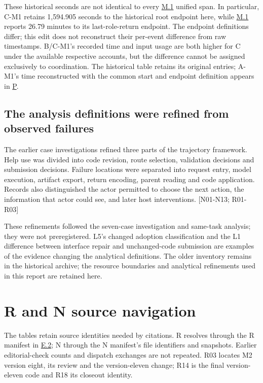 These historical seconds are not identical to every \hyperlink{m1}{M.1} unified span. In particular, C-M1 retains 1,594.905 seconds to the historical root endpoint here, while \hyperlink{m1}{M.1} reports 26.79 minutes to its last-role-return endpoint. The endpoint definitions differ; this edit does not reconstruct their per-event difference from raw timestamps. B/C-M1's recorded time and input usage are both higher for C under the available respective accounts, but the difference cannot be assigned exclusively to coordination. The historical table retains its original entries; A-M1's time reconstructed with the common start and endpoint definition appears in \hyperlink{appendix-p}{P}.

\subsection[The analysis definitions were refined from observed failures]{\texorpdfstring{\protect\hypertarget{h4}{}The analysis definitions were refined from observed failures}{The analysis definitions were refined from observed failures}}
The earlier case investigations refined three parts of the trajectory framework. Help use was divided into code revision, route selection, validation decisions and submission decisions. Failure locations were separated into request entry, model execution, artifact export, return encoding, parent reading and code application. Records also distinguished the actor permitted to choose the next action, the information that actor could see, and later host interventions. [N01-N13; R01-R03]

These refinements followed the seven-case investigation and same-task analysis; they were not preregistered. L5's changed adoption classification and the L1 difference between interface repair and unchanged-code submission are examples of the evidence changing the analytical definitions. The older inventory remains in the historical archive; the resource boundaries and analytical refinements used in this report are retained here.

\section[R and N source navigation]{\texorpdfstring{\protect\hypertarget{appendix-i}{}R and N source navigation}{R and N source navigation}}
The tables retain source identities needed by citations. R resolves through the R manifest in \hyperlink{e2}{E.2}; N through the N manifest's file identifiers and snapshots. Earlier editorial-check counts and dispatch exchanges are not repeated. R03 locates M2 version eight, its review and the version-eleven change; R14 is the final version-eleven code and R18 its closeout identity.


